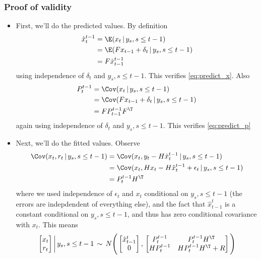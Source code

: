 \documentclass{article}
\begin{document}
\subsubsection{Proof of validity}

\begin{itemize}
\item First, we'll do the predicted values. By definition   
 \begin{align*}
  \hat{x}_t^{t-1} 
   &= \E( x_t \,|\, y_s, s \leq t-1 ) \\
   &= \E( F x_{t-1} + \delta_t \,|\, y_s, s \leq t-1 ) \\
   &= F \hat{x}_{t-1}^{t-1} 
  \end{align*}
  using independence of $\delta_t$ and $y_s, s \leq t-1$. This verifies
  \eqref{eq:predict_x}. Also 
  \begin{align*}
  P_t^{t-1} 
  &= \Cov( x_t \,|\, y_s, s \leq t-1 ) \\
  &= \Cov( F x_{t-1} + \delta_t \,|\, y_s, s \leq t-1 ) \\
  &= F P_{t-1}^{t-1} F^\T 
  \end{align*}
  again using independence of $\delta_t$ and $y_s, s \leq t-1$. This verifies
  \eqref{eq:predict_p} 

\item Next, we'll do the fitted values. Observe 
  \begin{align*}
  \Cov(x_t, r_t \,|\, y_s, s \leq t-1) 
  &= \Cov(x_t, y_t - H \hat{x}_t^{t-1} \,|\, y_s, s \leq t-1) \\
  &= \Cov(x_t, H x_t - H \hat{x}_t^{t-1} + \epsilon_t \,|\, y_s, s \leq t-1) \\
  &= P_t^{t-1} H^\T 
  \end{align*}
  where we used independence of $\epsilon_t$ and $x_t$ conditional on $y_s, s
  \leq t-1$ (the errors are indepdendent of everything else), and the fact that
  $\hat{x}_{t-1}^t$ is a constant conditional on $y_s, s \leq t-1$, and thus has
  zero conditional covariance with $x_t$. This means  
  \[
  \begin{bmatrix} x_t \\ r_t \end{bmatrix} 
  \bigg|\, y_s, s \leq t-1 \,\sim\, 
  N\Bigg( 
    \begin{bmatrix} \hat{x}_{t-1}^t \\ 0 \end{bmatrix}, \, 
    \begin{bmatrix} P_t^{t-1} & P_t^{t-1} H^\T \\ H P_t^{t-1} 
      & H P_t^{t-1} H^\T+ R \end{bmatrix} 
    \Bigg)
  \]


\end{itemize}
\end{document}
